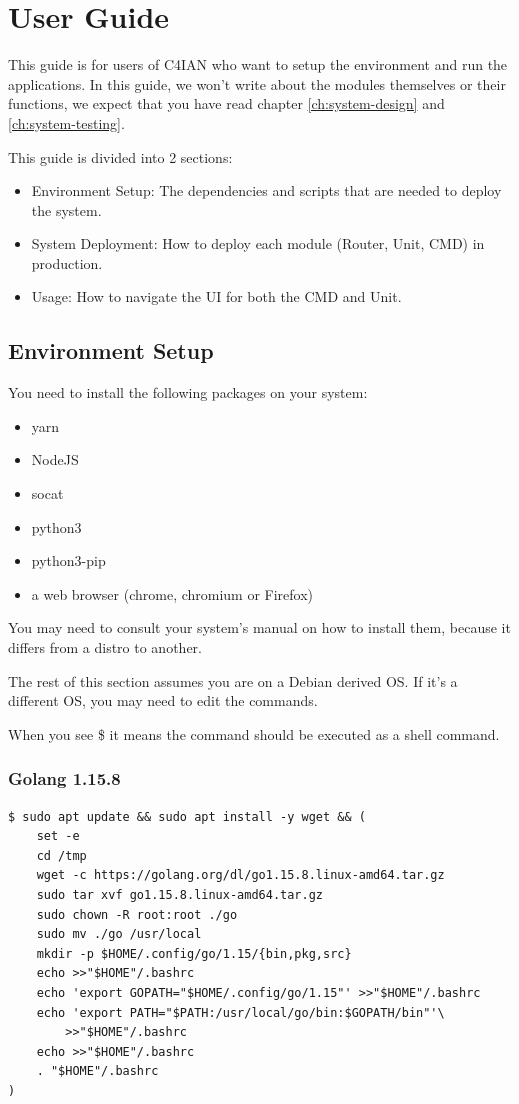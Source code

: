 \chapter{User Guide}
This guide is for users of C4IAN who want to setup the environment and run the applications.
In this guide, we won't write about the modules themselves or their functions, we expect that you have read chapter \ref{ch:system-design} and \ref{ch:system-testing}.

This guide is divided into 2 sections:
\begin{itemize}[itemsep=1pt, topsep=5pt]
    \item Environment Setup: The dependencies and scripts that are needed to deploy the system.
    \item System Deployment: How to deploy each module (Router, Unit, CMD) in production.
    \item Usage: How to navigate the UI for both the CMD and Unit.
\end{itemize}

\section{Environment Setup}
You need to install the following packages on your system:
\begin{itemize}[itemsep=1pt, topsep=5pt]
    \item yarn
    \item NodeJS
    \item socat
    \item python3
    \item python3-pip
    \item a web browser (chrome, chromium or Firefox)
\end{itemize}

You may need to consult your system's manual on how to install them, because it differs from a distro to another.

The rest of this section assumes you are on a Debian derived OS.
If it's a different OS, you may need to edit the commands.

When you see \$ it means the command should be executed as a shell command.

\subsection{Golang 1.15.8}
\begin{verbatim}
$ sudo apt update && sudo apt install -y wget && (
    set -e
    cd /tmp
    wget -c https://golang.org/dl/go1.15.8.linux-amd64.tar.gz
    sudo tar xvf go1.15.8.linux-amd64.tar.gz
    sudo chown -R root:root ./go
    sudo mv ./go /usr/local
    mkdir -p $HOME/.config/go/1.15/{bin,pkg,src}
    echo >>"$HOME"/.bashrc
    echo 'export GOPATH="$HOME/.config/go/1.15"' >>"$HOME"/.bashrc
    echo 'export PATH="$PATH:/usr/local/go/bin:$GOPATH/bin"'\ 
        >>"$HOME"/.bashrc
    echo >>"$HOME"/.bashrc
    . "$HOME"/.bashrc
)
\end{verbatim}

